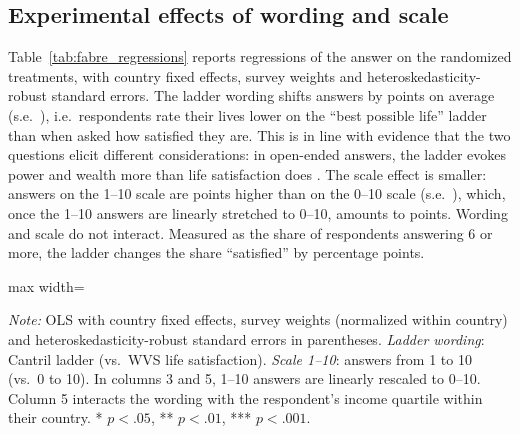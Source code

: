 \subsection{Experimental effects of wording and scale}\label{subsec:experiment}

Table~\ref{tab:fabre_regressions} reports regressions of the answer on the randomized treatments, with country fixed effects, survey weights and heteroskedasticity-robust standard errors. The ladder wording shifts answers by \effectLadder points on average (s.e.\ \seLadder), i.e.\ respondents rate their lives lower on the ``best possible life'' ladder than when asked how satisfied they are. This is in line with evidence that the two questions elicit different considerations: in open-ended answers, the ladder evokes power and wealth more than life satisfaction does \citep{nilsson_cantril_2024}. The scale effect is smaller: answers on the 1--10 scale are \effectScale points higher than on the 0--10 scale (s.e.\ \seScale), which, once the 1--10 answers are linearly stretched to 0--10, amounts to \effectScaleZeroTen points. Wording and scale do not interact. Measured as the share of respondents answering 6 or more, the ladder changes the share ``satisfied'' by \effectLadderSatisfied percentage points.

\begin{table}[htbp]
    \centering
    \caption{Effects of question wording and scale on life evaluation, Fabre (2025) survey experiment}\label{tab:fabre_regressions}
    \begin{adjustbox}{max width=\textwidth}
    
    \end{adjustbox}
    \begin{minipage}{\textwidth}\footnotesize \textit{Note:} OLS with country fixed effects, survey weights (normalized within country) and heteroskedasticity-robust standard errors in parentheses. \textit{Ladder wording}: Cantril ladder (vs.\ WVS life satisfaction). \textit{Scale 1--10}: answers from 1 to 10 (vs.\ 0 to 10). In columns 3 and 5, 1--10 answers are linearly rescaled to 0--10. Column 5 interacts the wording with the respondent's income quartile within their country. * $p<.05$, ** $p<.01$, *** $p<.001$.\end{minipage}
\end{table}


